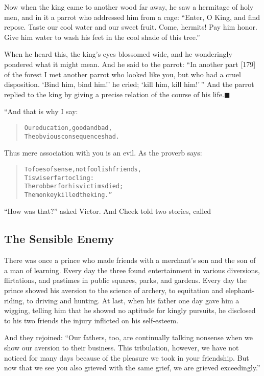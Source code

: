 \documentclass[article, twoside, 14pt]{memoir}
\newcommand{\qed}{\hfill \ensuremath{\blacksquare}}
\renewenvironment{verbatim}{%
\begin{quote}%
\vskip -10pt%
\begin{alltt}\normalfont\large}{\end{alltt}%
\end{quote}%
\vskip -10pt
} %
\begin{document}
Now when the king came to another wood far away, he saw a hermitage
of holy men, and in it a parrot who addressed him from a cage:
``Enter, O King, and find repose. Taste our cool water and our sweet fruit. Come, hermits! Pay him honor. Give him water to wash his feet in the cool shade of this tree.''

When he heard this, the king's eyes blossomed wide, and he
wonderingly pondered what it might mean. And he said to the parrot:
``In another part [179] of the forest I met another parrot who looked like you, but who had a cruel disposition. `Bind him, bind him!' he cried; `kill him, kill him!'\,''
And the parrot replied to the king by giving a precise relation of
the course of his life.\hyperref[s32]{\qed}

“And that is why I say:

\begin{verbatim}
Our education, good and bad,
The obvious consequences had.
\end{verbatim}
Thus mere association with you is an evil. As the proverb says:

\begin{verbatim}
To foes of sense, not foolish friends,
    Tis wiser far to cling:
The robber for his victims died;
    The monkey killed the king.”
\end{verbatim}
``How was that?'' asked Victor. And Cheek told two stories, called

\subsection{The Sensible Enemy}

\label{s33}

There was once a prince who made friends with a merchant's son and
the son of a man of learning. Every day the three found
entertainment in various diversions, flirtations, and pastimes in
public squares, parks, and gardens. Every day the prince showed his
aversion to the science of archery, to equitation and
elephant-riding, to driving and hunting. At last, when his father
one day gave him a wigging, telling him that he showed no aptitude
for kingly pursuits, he disclosed to his two friends the injury
inflicted on his self-esteem.

And they rejoined:
``Our fathers, too, are continually talking nonsense when we show our aversion to their business. This tribulation, however, we have not noticed for many days because of the pleasure we took in your friendship. But now that we see you also grieved with the same grief, we are grieved exceedingly.''
\end{document}
